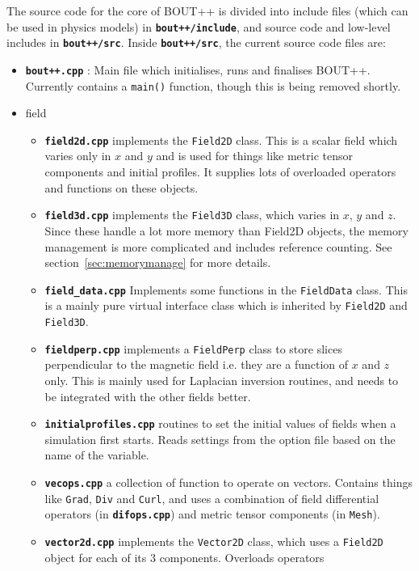 \documentclass[12pt]{article}
\newcommand{\code}[1]{\texttt{#1}}
\newcommand{\file}[1]{\texttt{\bf #1}}
\begin{document}
The source code for the core of BOUT++ is divided into
include files (which can be used in physics models) in 
\file{bout++/include}, and source code and low-level includes
in \file{bout++/src}. Inside \file{bout++/src}, the current source code
files are:
\begin{itemize}
\item \file{bout++.cpp} : Main file which initialises, runs and finalises
  BOUT++. Currently contains a \code{main()} function, though this is
  being removed shortly.
\item field
  \begin{itemize}
  \item {} \file{field2d.cpp} implements the \code{Field2D} class. This is a
    scalar field which varies only in $x$ and $y$ and is used for things
    like metric tensor components and initial profiles. It supplies lots
    of overloaded operators and functions on these objects.
  \item \file{field3d.cpp} implements the \code{Field3D} class, which varies 
    in $x$, $y$ and $z$. Since these handle a lot more memory than Field2D
    objects, the memory management is more complicated and includes reference
    counting. See section~\ref{sec:memorymanage} for more details.
  \item \file{field\_data.cpp} Implements some functions in the \code{FieldData} class. This is a mainly pure virtual interface class which is inherited by \code{Field2D} and \code{Field3D}.
  \item \file{fieldperp.cpp} implements a \code{FieldPerp} class to store
    slices perpendicular to the magnetic field i.e. they are a function of
    $x$ and $z$ only. This is mainly used for Laplacian inversion routines,
    and needs to be integrated with the other fields better.
  \item \file{initialprofiles.cpp} routines to set the initial values of
    fields when a simulation first starts. Reads settings from the option
    file based on the name of the variable.
  \item \file{vecops.cpp} a collection of function to operate on vectors. 
    Contains things like \code{Grad}, \code{Div} and \code{Curl}, and uses
    a combination of field differential operators (in \file{difops.cpp}) and
    metric tensor components (in \code{Mesh}).
  \item \file{vector2d.cpp} implements the \code{Vector2D} class, which uses
    a \code{Field2D} object for each of its 3 components. Overloads operators 

\end{itemize}
\end{itemize}
\end{document}
